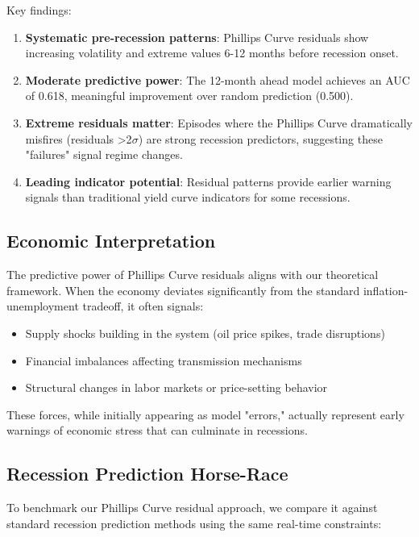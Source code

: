 \documentclass[12pt]{article}
\begin{document}
Key findings:

\begin{enumerate}
    \item \textbf{Systematic pre-recession patterns}: Phillips Curve residuals show increasing volatility and extreme values 6-12 months before recession onset.
    
    \item \textbf{Moderate predictive power}: The 12-month ahead model achieves an AUC of 0.618, meaningful improvement over random prediction (0.500).
    
    \item \textbf{Extreme residuals matter}: Episodes where the Phillips Curve dramatically misfires (residuals >2$\sigma$) are strong recession predictors, suggesting these "failures" signal regime changes.
    
    \item \textbf{Leading indicator potential}: Residual patterns provide earlier warning signals than traditional yield curve indicators for some recessions.
\end{enumerate}

\subsection{Economic Interpretation}

The predictive power of Phillips Curve residuals aligns with our theoretical framework. When the economy deviates significantly from the standard inflation-unemployment tradeoff, it often signals:

\begin{itemize}
    \item Supply shocks building in the system (oil price spikes, trade disruptions)
    \item Financial imbalances affecting transmission mechanisms
    \item Structural changes in labor markets or price-setting behavior
\end{itemize}

These forces, while initially appearing as model "errors," actually represent early warnings of economic stress that can culminate in recessions.

\subsection{Recession Prediction Horse-Race}

To benchmark our Phillips Curve residual approach, we compare it against standard recession prediction methods using the same real-time constraints:
\end{document}
